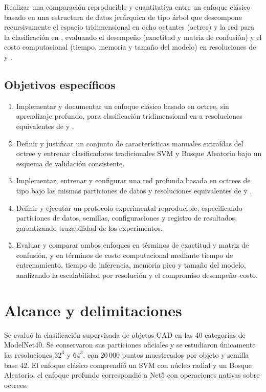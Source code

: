 Realizar una comparación reproducible y cuantitativa entre un enfoque clásico
basado en una estructura de datos jerárquica de tipo árbol que descompone
recursivamente el espacio tridimensional en ocho octantes (octree) y la red
\NetCinco para la clasificación en \ModelNet, evaluando el desempeño
(exactitud y matriz de confusión) y el costo computacional (tiempo, memoria y
tamaño del modelo) en resoluciones de  y .

\subsection{Objetivos específicos}

\begin{enumerate}[label=\arabic*.,leftmargin=*]
  \item Implementar y documentar un enfoque clásico basado en octree, sin
        aprendizaje profundo, para clasificación tridimensional en \ModelNet
        a resoluciones equivalentes de  y .

  \item Definir y justificar un conjunto de características manuales extraídas
        del octree y entrenar clasificadores tradicionales SVM y Bosque
        Aleatorio bajo un esquema de validación consistente.

  \item Implementar, entrenar y configurar una red profunda basada en octrees
        de tipo \NetCinco bajo las mismas particiones de datos y resoluciones
        equivalentes de  y .

  \item Definir y ejecutar un protocolo experimental reproducible,
        especificando particiones de datos, semillas, configuraciones y
        registro de resultados, garantizando trazabilidad de los
        experimentos.

  \item Evaluar y comparar ambos enfoques en términos de exactitud y matriz de
        confusión, y en términos de costo computacional mediante tiempo de
        entrenamiento, tiempo de inferencia, memoria pico y tamaño del modelo,
        analizando la escalabilidad por resolución y el compromiso
        desempeño--costo.
\end{enumerate}



\section{Alcance y delimitaciones}
\label{sec:alcance}
Se evaluó la clasificación supervisada de objetos CAD en las 40 categorías de ModelNet40. Se conservaron sus particiones oficiales y se estudiaron únicamente las resoluciones $32^3$ y $64^3$, con 20\,000 puntos muestreados por objeto y semilla base 42. El enfoque clásico comprendió un SVM con núcleo radial y un Bosque Aleatorio; el enfoque profundo correspondió a Net5 con operaciones nativas sobre octrees.

